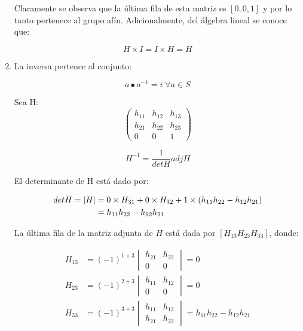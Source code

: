 \begin{enumerate}
Claramente se observa que la última fila de esta matriz es $[0,0,1]$ y por lo tanto
pertenece al grupo afín. Adicionalmente, del álgebra lineal se conoce que:

\begin{equation*}
H \times I = I \times H = H
\end{equation*} 

\item La inversa pertence al conjunto:

\begin{equation*}
a \bullet a^{-1} = i \; \forall a \in S
\end{equation*} 

Sea H:
\begin{equation*}
\begin{pmatrix}
h_{11} & h_{12} & h_{13} \\
h_{21} & h_{22} & h_{23} \\
0 & 0 & 1
\end{pmatrix}
\end{equation*} 

\begin{equation}
H^{-1}=\frac{1}{det H} adj H
\label{eq:p40}
\end{equation} 

El determinante de H está dado por:

\begin{align}
det H = |H| &= 0 \times H_{31} + 0 \times H_{32} + 1 \times (h_{11} h_{22} - h_{12} h_{21}) \notag\\
            &= h_{11} h_{22} - h_{12} h_{21}
\label{eq:p41}
\end{align}

La última fila de la matriz adjunta de $H$ está dada por $[H_{13} H_{23} H_{33}]$, donde:

\begin{equation}
\begin{aligned}
H_{13} &= (-1)^{1+3}
\begin{vmatrix}
h_{21} & h_{22} \\
0 & 0
\end{vmatrix}
= 0 \\
H_{23} &= (-1)^{2+3}
\begin{vmatrix}
h_{11} & h_{12} \\
0 & 0
\end{vmatrix}
= 0 \\
H_{33} &= (-1)^{3+3}
\begin{vmatrix}
h_{11} & h_{12} \\
h_{21} & h_{22}
\end{vmatrix}
= h_{11} h_{22} - h_{12} h_{21}
\end{aligned} 
\label{eq:p42}
\end{equation}


\end{enumerate}

